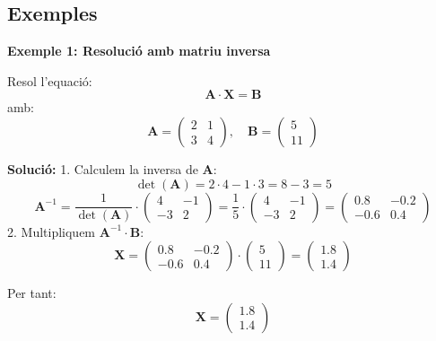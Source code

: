 \documentclass[12pt]{article}
\newcommand{\mat}[1]{\mathbf{#1}}
\begin{document}
\subsection*{Exemples}

\begin{exemple}
\textbf{Exemple 1: Resolució amb matriu inversa}

Resol l'equació:
\[
\mat{A} \cdot \mat{X} = \mat{B}
\]
amb:
\[
\mat{A} = \begin{pmatrix}
2 & 1 \\
3 & 4
\end{pmatrix}, \quad
\mat{B} = \begin{pmatrix}
5 \\
11
\end{pmatrix}
\]

\textbf{Solució:}
1. Calculem la inversa de $\mat{A}$:
\[
\det(\mat{A}) = 2 \cdot 4 - 1 \cdot 3 = 8 - 3 = 5
\]
\[
\mat{A}^{-1} = \frac{1}{\det(\mat{A})} \cdot \begin{pmatrix}
4 & -1 \\
-3 & 2
\end{pmatrix}
= \frac{1}{5} \cdot \begin{pmatrix}
4 & -1 \\
-3 & 2
\end{pmatrix}
= \begin{pmatrix}
0.8 & -0.2 \\
-0.6 & 0.4
\end{pmatrix}
\]
2. Multipliquem $\mat{A}^{-1} \cdot \mat{B}$:
\[
\mat{X} = \begin{pmatrix}
0.8 & -0.2 \\
-0.6 & 0.4
\end{pmatrix}
\cdot
\begin{pmatrix}
5 \\
11
\end{pmatrix}
=
\begin{pmatrix}
1.8 \\
1.4
\end{pmatrix}
\]

Per tant:
\[
\mat{X} = \begin{pmatrix}
1.8 \\
1.4
\end{pmatrix}
\]
\end{exemple}
\end{document}
